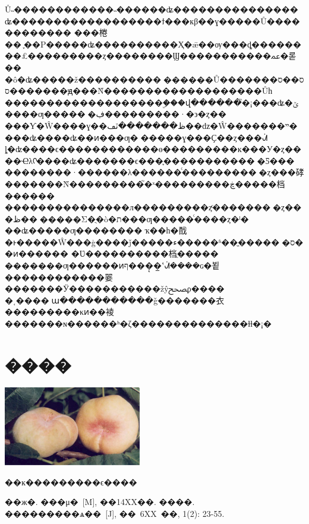 \documentclass[a4paper,11pt,onecolumn,twoside]{article}
\makeatletter
\newenvironment{figurehere}
  {\def\@captype{figure}}
  {}
\makeatother
\begin{document}
\begin{CJK*}{GBK}{song}
\begin{multicols}{2}
Ů˵������������˵������ʥ���������������ʥ������������������ϯ���кβ��ɣ�����Ů������������
���棬��᲻֪��Ρ�����ʥ����������Ҳ�ǣ��ѹ���ȡ��������£���������ȥ��������Ϣ�����������ﲻ�롣��
�ô�ʥ�����ž����������������Ů������ס��ס��ס������ԭ���Ǹ�������������������Ůһ
�������������������ۣ���վ������֮�¡���ʥ�ݶ����ƣ�����԰�ڣ���������·�϶�ȥ��\\
\indent ���Ƴ�Ŵ����ɣ��ظ�������ٽڡ��ǳ�Ŵ�������ײ����ʥ����ʥ��ͷ���ƣ�׬�����ɣ���Ҫ��ȥ���ᣬ
ȴ�ʣ����ϵ������������ɵ���������ĸ���У�ȥ����Ҽλᡣ����ʥ�������ϵ���֪������������Ƽ���
��������·������λ������ͨ���������񣬺�ȥ���硣�������Ǹ���������֮�ˣ���������ڿ�����档������
���������������л���������ȥͨ�������񣬷�ȥ���ظ��᣿�����Σ�ֻ�ò�ת���ƣ�����ͨ����ȥ�ˡ�\\
\indent ��ʥ�����ƣ��������ҡ��һ�䣬�ͱ�����Ŵ���ģ����ǰ�����ء�����ʱ��ֱ�����󣬰�ס��ͷ������
�Ʋ����������档ֻ�����
�������ƣ������ͷף���̨�̲ʽᣬ����ɢ�뵡������������翣�������Ӱ�����������žŷﵤϼ����
�˱����޶ա�����������ǧ�������衣���������κͷ��裬�������ɴ������ʰ�ζ��������������ɫɫ�¡�
\section{����}
\begin{figurehere}
\centering
\includegraphics[width=6cm]{Pantao.jpg}
\caption{��ĸ���������ϵ����}\label{fig2}
\end{figurehere}
\small
\begin{thebibliography}{99}
\setlength{\parskip}{0pt}  %
��ж�. ���μ�~[M], ��14XX��.
 ����. ���������ѧ��~[J], ��~6XX~��, 1(2): 23-55.


\end{thebibliography}
\end{multicols}
\end{CJK*}
\end{document}
